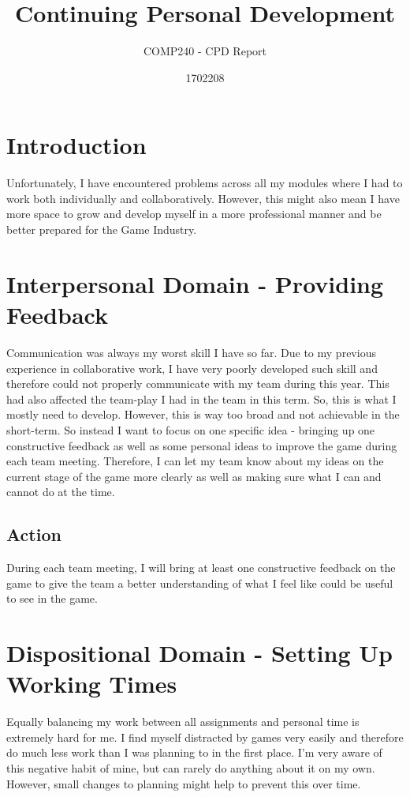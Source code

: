 \documentclass{scrartcl}
\title{Continuing Personal Development}
\subtitle{COMP240 - CPD Report}
\author{1702208}
\begin{document}
\maketitle

\section{Introduction}
Unfortunately, I have encountered problems across all my modules where I had to work both individually and collaboratively. However, this might also mean I have more space to grow and develop myself in a more professional manner and be better prepared for the Game Industry.

\section{Interpersonal Domain - Providing Feedback}
Communication was always my worst skill I have so far. Due to my previous experience in collaborative work, I have very poorly developed such skill and therefore could not properly communicate with my team during this year. This had also affected the team-play I had in the team in this term. So, this is what I mostly need to develop. However, this is way too broad and not achievable in the short-term. So instead I want to focus on one specific idea - bringing up one constructive feedback as well as some personal ideas to improve the game during each team meeting. Therefore, I can let my team know about my ideas on the current stage of the game more clearly as well as making sure what I can and cannot do at the time.

\subsection{Action}
During each team meeting, I will bring at least one constructive feedback on the game to give the team a better understanding of what I feel like could be useful to see in the game.

\section{Dispositional Domain - Setting Up Working Times}
Equally balancing my work between all assignments and personal time is extremely hard for me. I find myself distracted by games very easily and therefore do much less work than I was planning to in the first place. I'm very aware of this negative habit of mine, but can rarely do anything about it on my own. However, small changes to planning might help to prevent this over time. 
\end{document}
